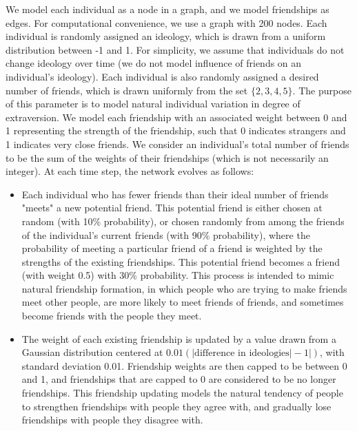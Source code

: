 \documentclass[12pt,letterpaper]{article}
\begin{document}
We model each individual as a node in a graph, and we model friendships as edges. For computational convenience, we use a graph with 200 nodes. Each individual is randomly assigned an ideology, which is drawn from a uniform distribution between -1 and 1. For simplicity, we assume that individuals do not change ideology over time (we do not model influence of friends on an individual's ideology). Each individual is also randomly assigned a desired number of friends, which is drawn uniformly from the set $\{2,3,4,5\}$. The purpose of this parameter is to model natural individual variation in degree of extraversion. We model each friendship with an associated weight between 0 and 1 representing the strength of the friendship, such that 0 indicates strangers and 1 indicates very close friends. We consider an individual's total number of friends to be the sum of the weights of their friendships (which is not necessarily an integer). At each time step, the network evolves as follows:
\begin{itemize}
\item Each individual who has fewer friends than their ideal number of friends "meets" a new potential friend. This potential friend is either chosen at random (with 10\% probability), or chosen randomly from among the friends of the individual's current friends (with 90\% probability), where the probability of meeting a particular friend of a friend is weighted by the strengths of the existing friendships. This potential friend becomes a friend (with weight 0.5) with 30\% probability. This process is intended to mimic natural friendship formation, in which people who are trying to make friends meet other people, are more likely to meet friends of friends, and sometimes become friends with the people they meet.
\item The weight of each existing friendship is updated by a value drawn from a Gaussian distribution centered at $0.01(|\text{difference in ideologies}| - 1|)$, with standard deviation 0.01. Friendship weights are then capped to be between 0 and 1, and friendships that are capped to 0 are considered to be no longer friendships. This friendship updating models the natural tendency of people to strengthen friendships with people they agree with, and gradually lose friendships with people they disagree with. 
\end{itemize}
\end{document}
